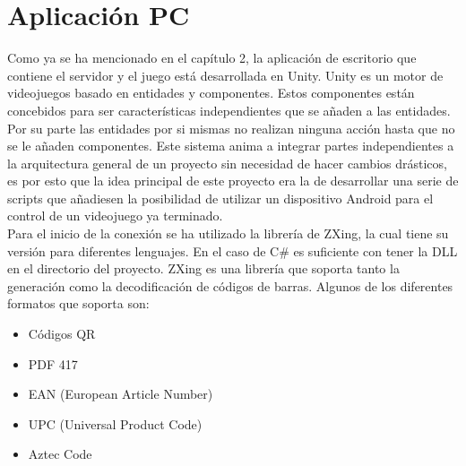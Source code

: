 \newpage
\section{Aplicaci\'on PC}
\label{cap4:sec:aplicaiconPC}

Como ya se ha mencionado en el cap\'itulo 2, la aplicaci\'on de escritorio que contiene el servidor y el juego est\'a desarrollada en Unity. Unity es un motor de videojuegos basado en entidades y componentes. Estos componentes est\'an concebidos para ser caracter\'isticas independientes que se a\~naden a las entidades. Por su parte las entidades por si mismas no realizan ninguna acci\'on hasta que no se le a\~naden componentes. Este sistema anima a integrar partes independientes a la arquitectura general de un proyecto sin necesidad de hacer cambios dr\'asticos, es por esto que la idea principal de este proyecto era la de desarrollar una serie de scripts que a\~nadiesen la posibilidad de utilizar un dispositivo Android para el control de un videojuego ya terminado.
\\
Para el inicio de la conexi\'on se ha utilizado la librer\'ia de ZXing, la cual tiene su versi\'on para diferentes lenguajes. En el caso de C\# es suficiente con tener la DLL en el directorio del proyecto. ZXing es una librer\'ia que soporta tanto la generaci\'on como la decodificaci\'on de c\'odigos de barras. Algunos de los diferentes formatos que soporta son:
\\
\begin{itemize}
\item C\'odigos QR
\item PDF 417
\item EAN (European Article Number)
\item UPC (Universal Product Code)
\item Aztec Code
\end {itemize}

